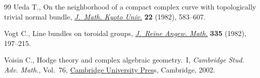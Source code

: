 \documentclass[10pt,a4paper]{amsart}
\numberwithin{equation}{section}
\begin{document}
\begin{thebibliography}{99}
Ueda T., On the neighborhood of a compact complex curve with topologically
 trivial normal bundle,
 \href{https://doi.org/10.1215/kjm/1250521670}{\textit{J.~Math. Kyoto Univ.}}
 \textbf{22} (1982), 583--607.

Vogt C., Line bundles on toroidal groups,
 \href{https://doi.org/10.1515/crll.1982.335.197}{\textit{J.~Reine Angew.
 Math.}} \textbf{335} (1982), 197--215.

Voisin C., Hodge theory and complex algebraic geometry.~{I}, \textit{Cambridge
 Stud. Adv. Math.}, Vol.~76,
 \href{https://doi.org/10.1017/CBO9780511615344}{Cambridge University Pres}s,
 Cambridge, 2002.

\end{thebibliography}
\end{document}
